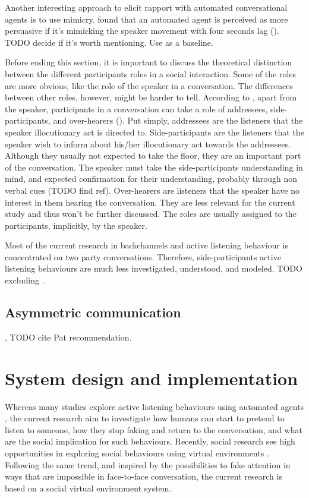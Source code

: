 \documentclass[]{simple-thesis}
\begin{document}
Another interesting approach to elicit rapport with automated conversational agents is to use mimicry.
\citeauthor{Bailenson2005} found that an automated agent is perceived as more persuasive if it's mimicking the speaker movement with four seconds lag (\citeyear{Bailenson2005}).
TODO decide if it's worth mentioning. Use \cite{Gratch2007} as a baseline.

Before ending this section, it is important to discuss the theoretical distinction between the different participants roles in a social interaction.
Some of the roles are more obvious, like the role of the speaker in a conversation.
The differences between other roles, however, might be harder to tell.
According to \citeauthor{Clark1982}, apart from the speaker, participants in a conversation can take a role of addressees, side-participants, and over-hearers (\citeyear{Clark1982}).
Put simply, addressees are the listeners that the speaker illocutionary act is directed to.
Side-participants are the listeners that the speaker wish to inform about his/her illocutionary act towards the addressees.
Although they usually not expected to take the floor, they are an important part of the conversation.
The speaker must take the side-participants understanding in mind, and expected confirmation for their understanding, probably through non verbal cues (TODO find ref).
Over-hearers are listeners that the speaker have no interest in them hearing the conversation.
They are less relevant for the current study and thus won't be further discussed.
The roles are usually assigned to the participants, implicitly, by the speaker.

Most of the current research in backchannels and active listening behaviour is concentrated on two party conversations.
Therefore, side-participants active listening behaviours are much less investigated, understood, and modeled.
TODO excluding \citep{Matsusaka2003, Fujie2009}.

\section{Asymmetric communication}

\citep{Chou2016}, TODO cite Pat recommendation.


\chapter{System design and implementation}\label{system_design_and_implementation}

Whereas many studies explore active listening behaviours using automated agents \citep{Bevacqua2008, Huang2011, Poppe2013}, the current research aim to investigate how humans can start to pretend to listen to someone, how they stop faking and return to the conversation, and what are the social implication for such behaviours.
Recently, social research see high opportunities in exploring social behaviours using virtual environments \citep{Bailenson2008}.
Following the same trend, and inspired by the possibilities to fake attention in ways that are impossible in face-to-face conversation, the current research is based on a social virtual environment system.
\end{document}
